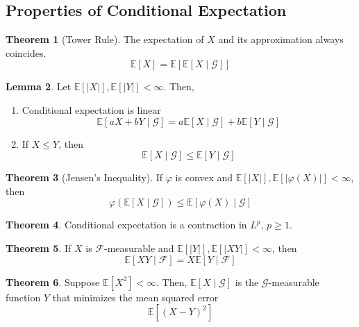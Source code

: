 \documentclass{article}
\theoremstyle{definition}
\newtheorem{theorem}{Theorem}[section]
\newtheorem{lemma}[theorem]{Lemma}
\theoremstyle{remark}
\theoremstyle{definition}
\begin{document}
\subsection{Properties of Conditional Expectation}

\begin{theorem}[Tower Rule]
The expectation of $X$ and its approximation always coincides. 
\[\mathbb{E}[X] = \mathbb{E}[\mathbb{E}[X \mid \mathcal{G}]]\]
\end{theorem}

\begin{lemma}
Let $\mathbb{E}[|X|] , \mathbb{E}[|Y|] < \infty$. Then, 
\begin{enumerate}
    \item Conditional expectation is linear
    \[\mathbb{E}[a X + b Y \mid \mathcal{G}] = a \mathbb{E}[X \mid \mathcal{G}] + b \mathbb{E}[Y \mid \mathcal{G}]\]
    
    \item If $X \leq Y$, then 
    \[\mathbb{E}[X \mid \mathcal{G}] \leq \mathbb{E}[Y \mid \mathcal{G}]\]
\end{enumerate}
\end{lemma}

\begin{theorem}[Jensen's Inequality]
If $\varphi$ is convex and $\mathbb{E}[|X|], \mathbb{E}[|\varphi(X)|] < \infty$, then 
\[\varphi(\mathbb{E}[X \mid \mathcal{G}]) \leq \mathbb{E}[\varphi(X) \mid \mathcal{G}]\]
\end{theorem}

\begin{theorem}
Conditional expectation is a contraction in $L^p$, $p \geq 1$. 
\end{theorem}

\begin{theorem}
If $X$ is $\mathcal{F}$-measurable and $\mathbb{E}[|Y|], \mathbb{E}[|XY|] < \infty$, then 
\[\mathbb{E}[XY \mid \mathcal{F}] = X \mathbb{E}[Y \mid \mathcal{F}]\]
\end{theorem}

\begin{theorem}
Suppose $\mathbb{E}[X^2] < \infty$. Then, $\mathbb{E}[X \mid \mathcal{G}]$ is the $\mathcal{G}$-measurable function $Y$ that minimizes the mean squared error 
\[\mathbb{E}[ (X - Y)^2]\]
\end{theorem}
\end{document}
